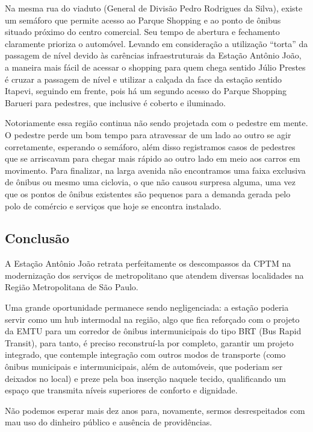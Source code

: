 \documentclass[11pt,fleqn]{book} %
\begin{document}
Na mesma rua do viaduto (General de Divisão Pedro Rodrigues da Silva), existe um semáforo que permite acesso ao Parque Shopping e ao ponto de ônibus situado próximo do centro comercial. Seu tempo de abertura e fechamento claramente prioriza o automóvel. Levando em consideração a utilização ``torta'' da passagem de nível devido às carências infraestruturais da Estação Antônio João, a maneira mais fácil de acessar o shopping para quem chega sentido Júlio Prestes é cruzar a passagem de nível e utilizar a calçada da face da estação sentido Itapevi, seguindo em frente, pois há um segundo acesso do Parque Shopping Barueri para pedestres, que inclusive é coberto e iluminado.

Notoriamente essa região continua não sendo projetada com o pedestre em mente. O pedestre perde um bom tempo para atravessar de um lado ao outro se agir corretamente, esperando o semáforo, além disso registramos casos de pedestres que se arriscavam para chegar mais rápido ao outro lado em meio aos carros em movimento. Para finalizar, na larga avenida não encontramos uma faixa exclusiva de ônibus ou mesmo uma ciclovia, o que não causou surpresa alguma, uma vez que os pontos de ônibus existentes são pequenos para a demanda gerada pelo polo de comércio e serviços que hoje se encontra instalado.

\subsection{Conclusão}

A Estação Antônio João retrata perfeitamente os descompassos da CPTM na modernização dos serviços de metropolitano que atendem diversas localidades na Região Metropolitana de São Paulo.

Uma grande oportunidade permanece sendo negligenciada: a estação poderia servir como um hub intermodal na região, algo que fica reforçado com o projeto da EMTU para um corredor de ônibus intermunicipais do tipo BRT (Bus Rapid Transit), para tanto, é preciso reconstruí-la por completo, garantir um projeto integrado, que contemple integração com outros modos de transporte (como ônibus municipais e intermunicipais, além de automóveis, que poderiam ser deixados no local) e preze pela boa inserção naquele tecido, qualificando um espaço que transmita níveis superiores de conforto e dignidade.

Não podemos esperar mais dez anos para, novamente, sermos desrespeitados com mau uso do dinheiro público e ausência de providências.
\end{document}

